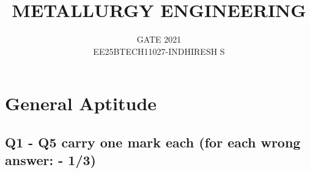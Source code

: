\documentclass[journal]{IEEEtran}
\theoremstyle{remark}
\begin{document}

\onecolumn

\title{METALLURGY ENGINEERING}
\author{GATE 2021\\
EE25BTECH11027-INDHIRESH S
}
\maketitle


\renewcommand{\thefigure}{\theenumi}
\renewcommand{\thetable}{\theenumi}

\section*{General Aptitude}
\subsection*{Q1 - Q5 carry one mark each  (for each wrong answer: - 1/3)}
\end{document}

